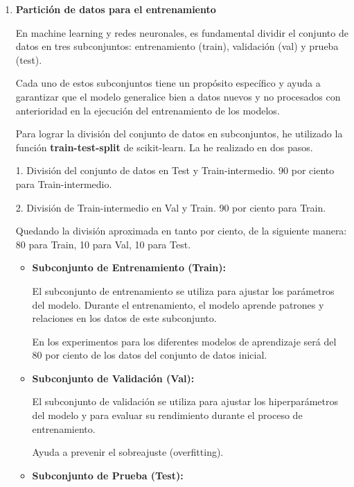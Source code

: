 \begin{enumerate}
\begin{itemize}
\end{itemize}


\item
\textbf{Partición de datos para el entrenamiento}

En machine learning y redes neuronales, es fundamental dividir el conjunto de datos en tres subconjuntos: entrenamiento (train), validación (val) y prueba (test). 

Cada uno de estos subconjuntos tiene un propósito específico y ayuda a garantizar que el modelo generalice bien a datos nuevos y no procesados con anterioridad en la ejecución del entrenamiento de los modelos. 

Para lograr la división del conjunto de datos en subconjuntos, he utilizado la función \textbf{train-test-split} de scikit-learn. La he realizado en dos pasos.

1. División del conjunto de datos en Test y Train-intermedio. 90 por ciento para Train-intermedio.

2. División de Train-intermedio en Val y Train. 90 por ciento para Train.

Quedando la división aproximada en tanto por ciento, de la siguiente manera:
80 para Train, 10 para Val, 10 para Test.





\begin{itemize}
	
\item
\textbf{Subconjunto de Entrenamiento (Train):}

	El subconjunto de entrenamiento se utiliza para ajustar los parámetros del modelo. Durante el entrenamiento, el modelo aprende patrones y relaciones en los datos de este subconjunto. 
	
	En los experimentos para los diferentes modelos de aprendizaje será del 80 por ciento de los datos del conjunto de datos inicial.

\item 
\textbf{Subconjunto de Validación (Val):}

	El subconjunto de validación se utiliza para ajustar los hiperparámetros del modelo y para evaluar su rendimiento durante el proceso de entrenamiento. 
	
	Ayuda a prevenir el sobreajuste (overfitting). 
	
\item 
\textbf{Subconjunto de Prueba (Test):}



\end{itemize}
\end{enumerate}
